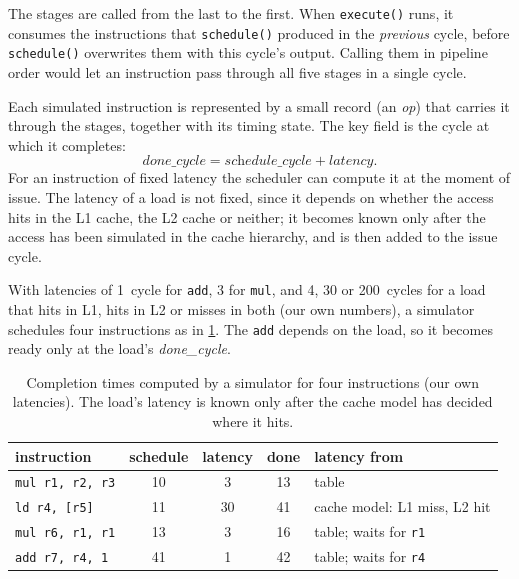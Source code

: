 \documentclass[../main.tex]{subfiles}
\begin{document}
The stages are called from the last to the first.  When
\texttt{execute()} runs, it consumes the instructions that
\texttt{schedule()} produced in the \emph{previous} cycle, before
\texttt{schedule()} overwrites them with this cycle's output.  Calling
them in pipeline order would let an instruction pass through all
five stages in a single cycle.

Each simulated instruction is represented by a small record (an
\emph{op}) that carries it through the stages, together with its
timing state.  The key field is the cycle at which it completes:
\begin{equation}
  \textit{done\_cycle} = \textit{schedule\_cycle} + \textit{latency}.
  \label{eq:l08-done-cycle}
\end{equation}
For an instruction of fixed latency the scheduler can compute it at
the moment of issue.  The latency of a load is not fixed, since it
depends on whether the access hits in the L1 cache, the L2 cache or
neither; it becomes known only after the access has been simulated
in the cache hierarchy, and is then added to the issue cycle.

\begin{example}
  \label{ex:l08-done-cycle}
  With latencies of \num{1}~cycle for \texttt{add}, \num{3} for
  \texttt{mul}, and \num{4}, \num{30} or \num{200}~cycles for a load
  that hits in L1, hits in L2 or misses in both (our own numbers), a
  simulator schedules four instructions as in
  \cref{tab:l08-done-cycle}.  The \texttt{add} depends on the load, so
  it becomes ready only at the load's \textit{done\_cycle}.
\end{example}

\begin{table}[tb]
  \centering
  \caption{Completion times computed by a simulator for four
    instructions (our own latencies).  The load's latency is known only
    after the cache model has decided where it hits.}
  \label{tab:l08-done-cycle}
  \begin{tabular}{@{}l c c c >{\raggedright\arraybackslash}p{40mm}@{}}
    \toprule
    instruction & schedule & latency & done & latency from \\
    \midrule
    \texttt{mul r1, r2, r3} & 10 & 3 & 13 & table \\
    \texttt{ld r4, [r5]} & 11 & 30 & 41 & cache model: L1 miss, L2 hit \\
    \texttt{mul r6, r1, r1} & 13 & 3 & 16 & table; waits for \texttt{r1} \\
    \texttt{add r7, r4, 1} & 41 & 1 & 42 & table; waits for \texttt{r4} \\
    \bottomrule
  \end{tabular}
\end{table}
\end{document}
